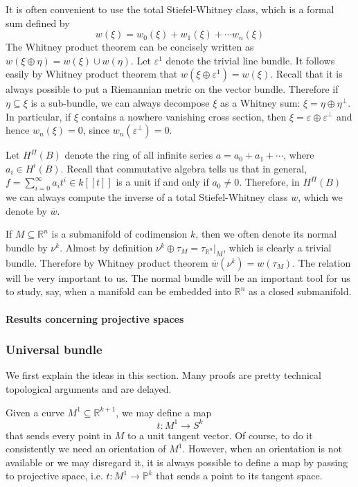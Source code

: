 \documentclass[12pt]{article}
\theoremstyle{plain}
\theoremstyle{definition}
\newcommand{\IP}{\mathbb{P}}
\newcommand{\IR}{\mathbb{R}}
\newcommand{\<}{\langle}
\renewcommand{\>}{\rangle}
\newcommand{\wb}{\overline}
\newcommand{\sm}{\varepsilon}
\begin{document}
It is often convenient to use the total Stiefel-Whitney class, which is a formal sum defined by 
$$ w(\xi) = w_0(\xi) + w_1(\xi) + \cdots w_n(\xi)$$
The Whitney product theorem can be concisely written as $w(\xi \oplus \eta) = w(\xi)  \cup w(\eta)$. Let $\sm^1$ denote the trivial line bundle. It follows easily by Whitney product theorem that $w(\xi \oplus \sm^1) = w(\xi)$. Recall that it is always possible to put a Riemannian metric on the vector bundle. Therefore if $\eta \subseteq \xi$ is a sub-bundle, we can always decompose $\xi$ as a Whitney sum: $\xi  = \eta \oplus \eta^\perp$. In particular, if $\xi$ contains a nowhere vanishing cross section, then $\xi = \sm \oplus \sm^\perp$ and hence $w_n (\xi ) = 0$, since $w_n(\sm^\perp) = 0$. 

Let $H^\Pi (B)$ denote the ring of all infinite series $a = a_0 + a_1 + \cdots$, where $a_i \in H^i(B)$. Recall that commutative algebra tells us that in general, $f  = \sum_{i = 0}^\infty a_i t^i \in k[[t]]$ is a unit if and only if $a_0 \neq 0$. Therefore, in  $H^\Pi (B)$ we can always compute the inverse of a total Stiefel-Whitney class $w$, which we denote by $\wb{w}$. 

If $M \subseteq \IR^n$ is a submanifold of codimension $k$, then we often denote its normal bundle by $\nu^k$. Almost by definition $\nu^k \oplus \tau_M = \tau_{\IR^n}|_{M}$, which is clearly a trivial bundle. Therefore by Whitney product theorem $\wb{w}(\nu^k) = w(\tau_M)$. The relation will be very important to us. The normal bundle will be an important tool for us to study, say, when a manifold can be embedded into $\IR^n$ as a closed submanifold. 

\paragraph{Results concerning projective spaces}



\subsubsection{Universal bundle}
We first explain the ideas in this section. Many proofs are pretty technical topological arguments and are delayed. 

Given a curve $M^1 \subseteq \IR^{k + 1}$, we may define a map $$t : M^1 \to S^k$$ that sends every point in $M$ to a unit tangent vector. Of course, to do it consistently we need an orientation of $M^1$. However, when an orientation is not available or we may disregard it, it is always possible to define a map by passing to projective space, i.e. $t : M^1 \to \IP^k$ that sends a point to its tangent space. 
\end{document}
